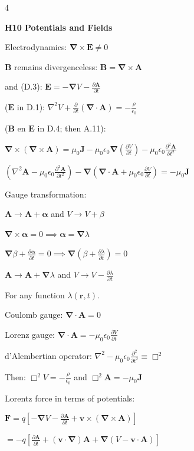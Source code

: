 \documentclass[a4paper,twoside]{article}
\newcommand{\secblock}[1]{%
\par\vspace{1.8pt}%
\noindent\colorbox{hdrcol}{\parbox[c][1.0em][c]{0.98\linewidth}{\color{white}\bfseries\small #1}}\par
\vspace{1pt}%
}
\begin{document}
\begin{multicols*}{4}
\secblock{H10 Potentials and Fields}

Electrodynamics: \(\bm \nabla \times \bm E \neq 0\)

\(\bm B\) remains divergenceless:
\(\bm B = \bm \nabla \times \bm A\)

and (D.3): \(\bm E = - \bm \nabla V - \frac{\partial \bm A}{\partial t}\)

(\(\bm E\) in D.1):
\(\nabla^2 V + \frac{\partial }{\partial t}(\bm \nabla \cdot \bm A) = -\frac{\rho}{\epsilon_0}\)

(\(\bm B\) en \(\bm E\) in D.4; then A.11):

\(\bm \nabla \times (\bm \nabla \times \bm A)= \mu_0 \bm J - \mu_0 \epsilon_0 \bm \nabla \left(\frac{\partial V }{\partial t}\right) - \mu_0 \epsilon_0 \frac{\partial^2 \bm A}{\partial t^2}\)

\( ( \nabla^2 \bm A - \mu_0 \epsilon_0 \frac{\partial^2 \bm A}{\partial t^2} )
- \bm \nabla (\bm \nabla \cdot \bm A + \mu_0 \epsilon_0 \frac{\partial V}{\partial t} )
= -\mu_0 \bm J\)

Gauge transformation:

\(\bm A \to \bm A + \bm \alpha\) and \(V \to V + \beta\)

\(\bm \nabla \times \bm\alpha = 0 \implies \bm \alpha = \bm \nabla \lambda\)

\(\bm \nabla \beta + \frac{\partial \bm \alpha}{\partial t} = 0 \implies\bm \nabla (\beta + \frac{\partial \lambda}{\partial t})=0\)

\(\bm A \to \bm A + \bm \nabla \lambda\) and \(V \to V - \frac{\partial \lambda}{\partial t}\)

For any function \(\lambda(\bm r, t)\).

Coulomb gauge: \(\bm \nabla \cdot \bm A = 0\)

Lorenz gauge: \(\bm \nabla \cdot \bm A = -\mu_0 \epsilon_0 \frac{\partial V}{\partial t} \)

d'Alembertian operator:  \(\nabla^2 -\mu_0 \epsilon_0 \frac{\partial^2}{\partial t^2} \equiv \Box^2\)

Then:
\(\Box^2 V = -\frac{\rho}{\epsilon_0}\) and \(\Box^2 \bm A = -\mu_0 \bm J\)

Lorentz force in terms of potentials:

\(\bm F = q [ -\bm \nabla V - \frac{\partial \bm A}{\partial t} + \bm v \times (\bm \nabla \times \bm A)] \)

\(= -q[\frac{\partial \bm A}{\partial t} + (\bm v \cdot \bm \nabla) \bm A + \bm \nabla (V-\bm v \cdot \bm A)]\)


\end{multicols*}
\end{document}
